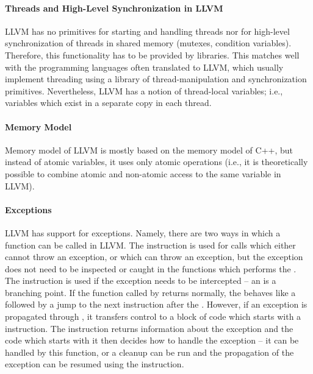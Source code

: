 \paragraph{Threads and High-Level Synchronization in LLVM}

LLVM has no primitives for starting and handling threads nor for high-level synchronization of threads in shared memory (mutexes, condition variables).
Therefore, this functionality has to be provided by libraries.
This matches well with the programming languages often translated to LLVM,
which usually implement threading using a library of thread-manipulation and
synchronization primitives.
Nevertheless, LLVM has a notion of thread-local variables; i.e., variables
which exist in a separate copy in each thread.

\paragraph{Memory Model}

Memory model of LLVM is mostly based on the memory model of C++, but instead of
atomic variables, it uses only atomic operations (i.e., it is theoretically
possible to combine atomic and non-atomic access to the same variable in LLVM).

\paragraph{Exceptions}

LLVM has support for exceptions.
Namely, there are two ways in which a function can be called in LLVM.
The  instruction is used for calls which either cannot throw an
exception, or which can throw an exception, but the exception does not need to
be inspected or caught in the functions which performs the .
The  instruction is used if the exception needs to be intercepted --
an  is a branching point.
If the function called by  returns normally, the 
behaves like a  followed by a jump to the next instruction after the
.
However, if an exception is propagated through , it transfers control
to a block of code which starts with a  instruction.
The  instruction returns information about the exception and the
code which starts with it then decides how to handle the exception -- it can be
handled by this function, or a cleanup can be run and the propagation of the
exception can be resumed using the  instruction.

